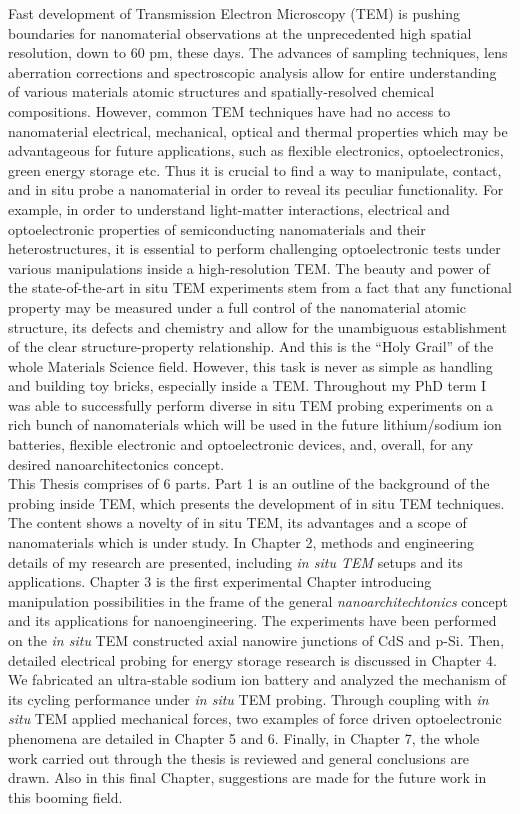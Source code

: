 \justify

Fast development of Transmission Electron Microscopy (TEM) is pushing boundaries for nanomaterial observations at the unprecedented high spatial resolution, down to 60 pm, these days. The advances of sampling techniques, lens aberration corrections and spectroscopic analysis allow for entire understanding of various materials atomic structures and spatially-resolved chemical compositions. However, common TEM techniques have had no access to nanomaterial electrical, mechanical, optical and thermal properties which may be advantageous for future applications, such as flexible electronics, optoelectronics, green energy storage etc. Thus it is crucial to find a way to manipulate, contact, and in situ probe a nanomaterial in order to reveal its peculiar functionality. For example, in order to understand light-matter interactions, electrical and optoelectronic properties of semiconducting nanomaterials and their heterostructures, it is essential to perform challenging optoelectronic tests under various manipulations inside a high-resolution TEM. The beauty and power of the state-of-the-art in situ TEM experiments stem from a fact that any functional property may be measured under a full control of the nanomaterial atomic structure, its defects and chemistry and allow for the unambiguous establishment of the clear structure-property relationship. And this is the “Holy Grail” of the whole Materials Science field. However, this task is never as simple as handling and building toy bricks, especially inside a TEM. Throughout my PhD term I was able to successfully perform diverse in situ TEM probing experiments on a rich bunch of nanomaterials which will be used in the future lithium/sodium ion batteries, flexible electronic and optoelectronic devices, and, overall, for any desired nanoarchitectonics concept. \\
This Thesis comprises of 6 parts. Part 1 is an outline of the background of the probing inside TEM, which presents the development of in situ TEM techniques. The content shows a novelty of in situ TEM, its advantages and a scope of nanomaterials which is under study. In Chapter 2, methods and engineering details of my research are presented, including {\em in situ TEM} setups and its applications. Chapter 3 is the first experimental Chapter introducing manipulation possibilities in the frame of the general {\em nanoarchitechtonics} concept and its applications for nanoengineering. The experiments have been performed on the {\em in situ} TEM constructed axial nanowire junctions of CdS and p-Si. Then, detailed electrical probing for energy storage research is discussed in Chapter 4. We fabricated an ultra-stable sodium ion battery and analyzed the mechanism of its cycling performance under {\em in situ} TEM probing. Through coupling with {\em in situ} TEM applied mechanical forces, two examples of force driven optoelectronic phenomena are detailed in Chapter 5 and 6. Finally, in Chapter 7, the whole work carried out through the thesis is reviewed and general conclusions are drawn. Also in this final Chapter, suggestions are made for the future work in this booming field. 
